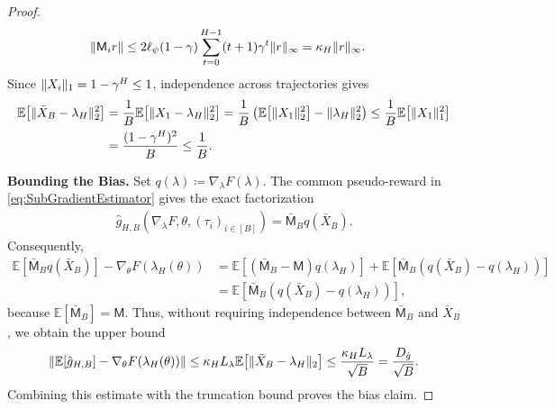 \documentclass{article}
\theoremstyle{plain}
\theoremstyle{definition}
\theoremstyle{remark}
\newcommand{\Exp}[1]{{ \mathbb{E}}\!\left[#1\right]}
\DeclarePairedDelimiter{\norm}{\lVert}{\rVert}
\newcommand{\define}{\coloneqq}
\newcommand{\setm}[1]{[#1]}
\def\gApprox{{\hat{g}}}
\def\rew{{r}}
\begin{document}
\begin{proof}
 \begin{align*}
  \norm{\mathsf M_i\rew}
   & \leq2\ell_\psi(1-\gamma)
  \sum_{t=0}^{H-1}(t+1)\gamma^t\norm{\rew}_\infty
  =\kappa_H\norm{\rew}_\infty.
 \end{align*}
 Since $\norm{X_i}_1=1-\gamma^H\leq1$, independence across trajectories
 gives
 \begin{align}
  \Exp{\norm{\bar X_B-\lambda_H}_2^2}
   & =\frac1B\Exp{\norm{X_1-\lambda_H}_2^2}
  =\frac1B\left(\Exp{\norm{X_1}_2^2}-\norm{\lambda_H}_2^2\right)
  \leq\frac1B\Exp{\norm{X_1}_1^2}\notag     \\
   & =\frac{(1-\gamma^H)^2}{B}\leq\frac1B.
  \label{eq:FullBatchOccupancyMSE}
 \end{align}

 \textbf{Bounding the Bias.} Set $q(\lambda)\define\nabla_\lambda F(\lambda)$. The common
 pseudo-reward in \eqref{eq:SubGradientEstimator} gives the exact
 factorization
 \begin{align*}
  \gApprox_{H,B}(\nabla_\lambda F,\theta,
  (\tau_i)_{i\in\setm{B}})
  =\bar{\mathsf M}_B q(\bar X_B).
 \end{align*}
 Consequently,
 \begin{align*}
  \Exp{\bar{\mathsf M}_Bq(\bar X_B)}
  -\nabla_\theta F(\lambda_H(\theta))
   & =\Exp{(\bar{\mathsf M}_B-\mathsf M)q(\lambda_H)}
  +\Exp{\bar{\mathsf M}_B(q(\bar X_B)-q(\lambda_H))}     \\
   & =\Exp{\bar{\mathsf M}_B(q(\bar X_B)-q(\lambda_H))},
 \end{align*}
 because $\Exp{\bar{\mathsf M}_B}=\mathsf M$. Thus, without requiring
 independence between $\bar{\mathsf M}_B$ and $\bar X_B$,
 we obtain the upper bound
 \begin{align*}
  \norm*{\Exp{\gApprox_{H,B}}-\nabla_\theta F(\lambda_H(\theta))}
  \leq\kappa_H L_\lambda\Exp{\norm{\bar X_B-\lambda_H}_2}
  \leq\frac{\kappa_HL_\lambda}{\sqrt B}
  =\frac{D_{\gApprox}}{\sqrt B}.
 \end{align*}
 Combining this estimate with the truncation bound proves the bias claim.


\end{proof}
\end{document}
